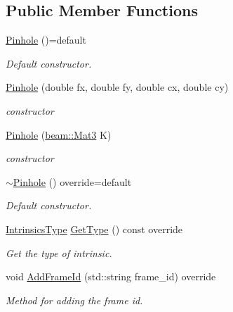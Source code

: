 \subsection*{Public Member Functions}
\begin{DoxyCompactItemize}
\item 
\hyperlink{classbeam__calibration_1_1_pinhole_abba8b5c4d7d467b4137802dc1221cf5c}{Pinhole} ()=default
\begin{DoxyCompactList}\small\item\em Default constructor. \end{DoxyCompactList}\item 
\hyperlink{classbeam__calibration_1_1_pinhole_aafd4e22eac71beed825c306981a4a59a}{Pinhole} (double fx, double fy, double cx, double cy)
\begin{DoxyCompactList}\small\item\em constructor \end{DoxyCompactList}\item 
\hyperlink{classbeam__calibration_1_1_pinhole_a63dd0e2c171429a6b6e9a69c13b273ed}{Pinhole} (\hyperlink{group__utils_ga665fed2673de952d12b19351a2bdb961}{beam\+::\+Mat3} K)
\begin{DoxyCompactList}\small\item\em constructor \end{DoxyCompactList}\item 
\hyperlink{classbeam__calibration_1_1_pinhole_a42abf55373c49f0ce0a44535498e1c33}{$\sim$\+Pinhole} () override=default
\begin{DoxyCompactList}\small\item\em Default constructor. \end{DoxyCompactList}\item 
\hyperlink{group__calibration_ga9abafc7bdd7c31c8fdbd4cc90df9a956}{Intrinsics\+Type} \hyperlink{classbeam__calibration_1_1_pinhole_a54dd38a3820f71a5d8b6a753d32da56f}{Get\+Type} () const override
\begin{DoxyCompactList}\small\item\em Get the type of intrinsic. \end{DoxyCompactList}\item 
void \hyperlink{classbeam__calibration_1_1_pinhole_ae9a7670fe65481cd2b3847d8fd07c7be}{Add\+Frame\+Id} (std\+::string frame\+\_\+id) override
\begin{DoxyCompactList}\small\item\em Method for adding the frame id. \end{DoxyCompactList}\item 

\end{DoxyCompactItemize}
